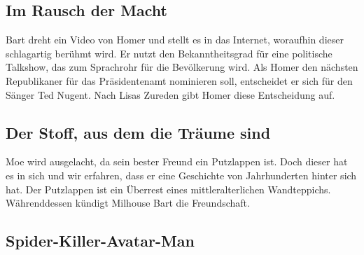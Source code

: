 \subsection{Im Rausch der Macht}\label{PABF03}
Bart dreht ein Video von Homer und stellt es in das Internet, woraufhin dieser schlagartig berühmt wird. Er nutzt den Bekanntheitsgrad für eine politische Talkshow, das zum Sprachrohr für die Bevölkerung wird. Als Homer den nächsten Republikaner für das Präsidentenamt nominieren soll, entscheidet er sich für den Sänger Ted Nugent. Nach Lisas Zureden gibt Homer diese Entscheidung auf. 


\subsection{Der Stoff, aus dem die Träume sind}
Moe wird ausgelacht, da sein bester Freund ein Putzlappen ist. Doch dieser hat es in sich und wir erfahren, dass er eine Geschichte von Jahrhunderten hinter sich hat. Der Putzlappen ist ein Überrest eines mittleralterlichen Wandteppichs.  Währenddessen kündigt Milhouse Bart die Freundschaft.


\subsection{Spider-Killer-Avatar-Man}

